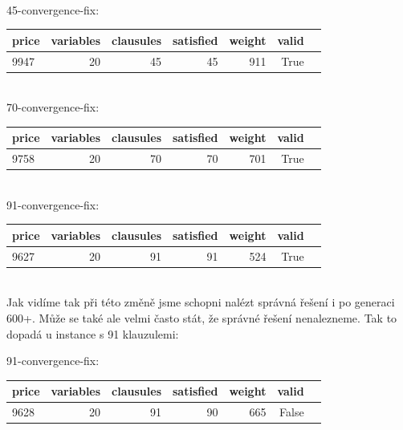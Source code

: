 \documentclass[a4paper,10pt,twocolumn]{article}
\begin{document}
\begin{itemize}
\begin{itemize}
\\
45-convergence-fix:\\



\begin{tabular}{lrrrrrl}
\toprule
        price &  variables &  clausules &  satisfied &  weight &  valid \\
\midrule
\hline

 9947 &         20 &         45 &         45 &     911 &   True \\
\bottomrule
\end{tabular}
\\



70-convergence-fix:\\



\begin{tabular}{lrrrrrl}
\toprule
        price &  variables &  clausules &  satisfied &  weight &  valid \\
\midrule
\hline

 9758 &         20 &         70 &         70 &     701 &   True \\
\bottomrule
\end{tabular}
\\



91-convergence-fix: \\


\begin{tabular}{lrrrrrl}
\toprule
        price &  variables &  clausules &  satisfied &  weight &  valid \\
\midrule
\hline

 9627 &         20 &         91 &         91 &     524 &   True \\
\bottomrule
\end{tabular}
\\

Jak vidíme tak při této změně jsme schopni nalézt správná řešení i po generaci 600+. Může se také ale velmi často stát, že správné řešení nenalezneme. Tak to dopadá u instance s 91 klauzulemi:

91-convergence-fix:\\
\begin{tabular}{lrrrrrl}
\toprule
        price &  variables &  clausules &  satisfied &  weight &  valid \\
\midrule
\hline

 9628 &         20 &         91 &         90 &     665 &  False \\
\bottomrule
\end{tabular}
\\

\end{itemize}
\end{itemize}
\end{document}
